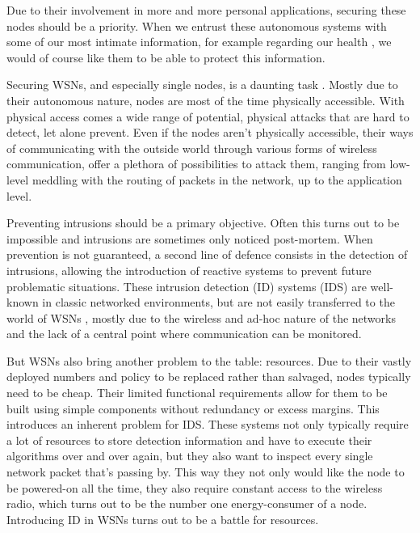 \documentclass[conference]{IEEEtran}
\begin{document}
Due to their involvement in more and more personal applications, securing these
nodes should be a priority. When we entrust these autonomous systems with some
of our most intimate information, for example regarding our health
\cite{stankovic2005wireless}, we would of course like them to be able to
protect this information.

Securing WSNs, and especially single nodes, is a daunting task
\cite{perrig2004security}. Mostly due to their autonomous nature, nodes are
most of the time physically accessible. With physical access comes a wide range
of potential, physical attacks \cite{becher2006tampering} that are hard to
detect, let alone prevent. Even if the nodes aren't physically accessible,
their ways of communicating with the outside world through various forms of
wireless communication, offer a plethora of possibilities
\cite{padmavathi2009survey} to attack them, ranging from low-level meddling
with the routing of packets in the network, up to the application level.

Preventing intrusions should be a primary objective. Often this turns out to be
impossible and intrusions are sometimes only noticed post-mortem. When
prevention is not guaranteed, a second line of defence consists in the
detection of intrusions, allowing the introduction of reactive systems to
prevent future problematic situations. These intrusion detection (ID) systems
(IDS) are well-known in classic networked environments, but are not easily
transferred to the world of WSNs \cite{zhang2000intrusion}
\cite{djenouri2005survey}, mostly due to the wireless and ad-hoc nature of the
networks and the lack of a central point where communication can be monitored.

But WSNs also bring another problem to the table: resources. Due to their
vastly deployed numbers and policy to be replaced rather than salvaged, nodes
typically need to be cheap. Their limited functional requirements allow for
them to be built using simple components without redundancy or excess margins.
This introduces an inherent problem for IDS. These systems not only typically
require a lot of resources to store detection information and have to execute
their algorithms over and over again, but they also want to inspect every
single network packet that's passing by. This way they not only would like the
node to be powered-on all the time, they also require constant access to the
wireless radio, which turns out to be the number one energy-consumer of a node.
Introducing ID in WSNs turns out to be a battle for resources.
\end{document}
